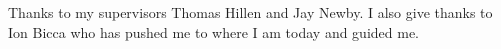 \documentclass[\main/thesis.tex]{subfiles}
\begin{document}
\begin{acknowledgements} 
Thanks to my supervisors Thomas Hillen and Jay Newby. I also give thanks to Ion Bicca who has pushed me to where I am today and guided me.
\end{acknowledgements}
\end{document}
